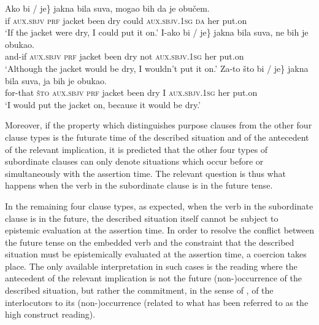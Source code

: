 \documentclass[output=paper,
colorlinks,
citecolor=brown,
newtxmath
]{langscibook}
\begin{document}
{\ea\label{ex:Cond-both}
\ea \gll Ako \minsp{\{} bi / \minsp{*} je\} jakna bila suva, mogao bih da je obučem.\\
    if {} \textsc{aux.sbjv} {} {} \textsc{prf} jacket been dry could \textsc{aux.sbjv.1sg} \textsc{da} her put.on\\
    \glt `If the jacket were dry, I could put it on.'\label{ex:Cond-both-a}
\ex \gll I-ako \minsp{\{} bi / \minsp{*} je\} jakna bila suva, ne bih je obukao.\\
    and-if {} \textsc{aux.sbjv} {} {} \textsc{prf} jacket been dry not \textsc{aux.sbjv.1sg} her put.on\\
    \glt `Although the jacket would be dry, I wouldn't put it on.'\label{ex:Cond-both-b}
\ex \gll Za-to što \minsp{\{} bi / \minsp{*} je\} jakna bila suva, ja bih je obukao.\\
    for-that \textsc{što} {} \textsc{aux.sbjv} {} {} \textsc{prf} jacket been dry I \textsc{aux.sbjv.1sg} her put.on\\
    \glt `I would put the jacket on, because it would be dry.'\label{ex:Cond-both-c}
\z\z}

\ea\label{ex:Unreal-m-verb1}
\label{ex:Unreal-m-verb1-a}
\label{ex:Unreal-m-verb1-b}
\z\z

\noindent Moreover, if the property which distinguishes purpose clauses from the other four clause types is the futurate time of the described situation and of the antecedent of the relevant implication, it is predicted that the other four types of subordinate clauses can only denote situations which occur before or simultaneously with the assertion time. The relevant question is thus what happens when the verb in the subordinate clause is in the future tense.

\largerpage[2] %

In the remaining four clause types, as expected, when the verb in the subordinate clause is in the future, the described situation itself cannot be subject to epistemic evaluation at the assertion time. In order to resolve the conflict between the future tense on the embedded verb and the constraint that the described situation must be epistemically evaluated at the assertion time, a coercion takes place. The only available interpretation in such cases is the reading where the antecedent of the relevant implication is not the future (non-)occurrence of the described situation, but rather the commitment, in the sense of \citet{Krifka2015}, of the interlocutors to its (non-)occurrence (related to what has been referred to as the high construct reading).
\end{document}
